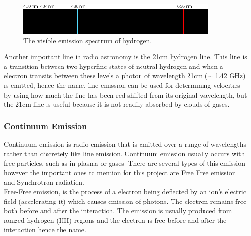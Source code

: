 \documentclass[10pt,a4paper]{article}
\begin{document}
\begin{figure}[H]
\begin{center}
	\includegraphics[width=0.9\textwidth]{Hspec}
	\caption{The visible emission spectrum of hydrogen\footnotemark.}
	\label{Hspec}
\end{center}
\end{figure}
Another important line in radio astronomy is the 21cm hydrogen line. This line is a transition between two hyperfine states of neutral hydrogen and when a electron transits between these levels a photon of wavelength 21cm ($\sim$ 1.42 GHz) is emitted, hence the name. line emission can be used for determining velocities by using how much the line has been red shifted from its original wavelength, but the 21cm line is useful because it is not readily absorbed by clouds of gases.\\
\subsubsection*{Continuum Emission}
Continuum emission is radio emission that is emitted over a range of wavelengths rather than discretely like line emission. Continuum emission usually occurs with free particles, such as in plasma or gases.  There are several types of this emission however the important ones to mention for this project are Free Free emission and Synchrotron radiation.\\

Free-Free emission, is the process of a electron being deflected by an ion's electric field (accelerating it) which causes emission of photons. The electron remains free both before and after the interaction. The emission is usually produced from ionized hydrogen (HII) regions and the electron is free before and after the interaction hence the name.\\
\end{document}
